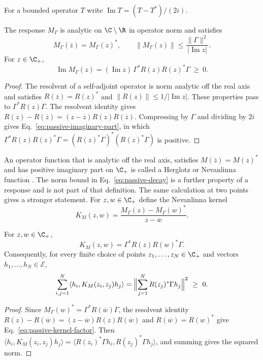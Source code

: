 For a bounded operator $T$ write $\operatorname{Im}T=(T-T^*)/(2i)$.

\begin{proposition}
\label{prop:passive-herglotz}
The response $M_\Gamma$ is analytic on $\C\setminus\R$ in operator norm and satisfies
\begin{equation}
 M_\Gamma(\overline z)=M_\Gamma(z)^*,\qquad \|M_\Gamma(z)\|\le\frac{\|\Gamma\|^2}{|\operatorname{Im}z|} .
 \label{eq:passive-decay}
\end{equation}
For $z\in\C_+$,
\begin{equation}
 \operatorname{Im}M_\Gamma(z)=(\operatorname{Im}z)\,\Gamma^*R(z)R(z)^*\Gamma\ \geq\ 0 .
 \label{eq:passive-imaginary-part}
\end{equation}
\end{proposition}
\begin{proof}
The resolvent of a self-adjoint operator is norm analytic off the real axis and satisfies $R(\overline z)=R(z)^*$ and $\|R(z)\|\le1/|\operatorname{Im}z|$. These properties pass to $\Gamma^*R(z)\Gamma$. The resolvent identity gives $R(z)-R(\overline z)=(z-\overline z)R(z)R(\overline z)$. Compressing by $\Gamma$ and dividing by $2i$ gives Eq.~\eqref{eq:passive-imaginary-part}, in which $\Gamma^*R(z)R(z)^*\Gamma=(R(z)^*\Gamma)^*(R(z)^*\Gamma)$ is positive.
\end{proof}

An operator function that is analytic off the real axis, satisfies $M(\overline z)=M(z)^*$ and has positive imaginary part on $\C_+$ is called a Herglotz or Nevanlinna function \cite{Donoghue}. The norm bound in Eq.~\eqref{eq:passive-decay} is a further property of a response and is not part of that definition. The same calculation at two points gives a stronger statement. For $z,w\in\C_+$ define the Nevanlinna kernel
\begin{equation}
 K_M(z,w)=\frac{M_\Gamma(z)-M_\Gamma(w)^*}{z-\overline w}.
 \label{eq:passive-nevanlinna-kernel}
\end{equation}

\begin{proposition}
\label{prop:passive-kernel}
For $z,w\in\C_+$,
\begin{equation}
 K_M(z,w)=\Gamma^*R(z)R(w)^*\Gamma .
 \label{eq:passive-kernel-factor}
\end{equation}
Consequently, for every finite choice of points $z_1,\dots,z_N\in\C_+$ and vectors $h_1,\dots,h_N\in\mathcal E$,
\begin{equation}
 \sum_{i,j=1}^N\langle h_i,K_M(z_i,z_j)h_j\rangle
   =\Bigl\|\sum_{j=1}^N R(z_j)^*\Gamma h_j\Bigr\|^2\ \geq\ 0 .
 \label{eq:passive-kernel-positive}
\end{equation}
\end{proposition}
\begin{proof}
Since $M_\Gamma(w)^*=\Gamma^*R(\overline w)\Gamma$, the resolvent identity $R(z)-R(\overline w)=(z-\overline w)R(z)R(\overline w)$ and $R(\overline w)=R(w)^*$ give Eq.~\eqref{eq:passive-kernel-factor}. Then $\langle h_i,K_M(z_i,z_j)h_j\rangle=\langle R(z_i)^*\Gamma h_i,R(z_j)^*\Gamma h_j\rangle$, and summing gives the squared norm.
\end{proof}


